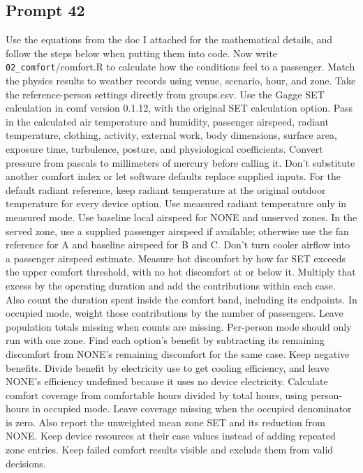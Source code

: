 \subsection*{Prompt 42}
Use the equations from the doc I attached for the mathematical details, and follow the steps below when putting them into code. Now write \nolinkurl{02_comfort}/comfort.R to calculate how the conditions feel to a passenger. Match the physics results to weather records using venue, scenario, hour, and zone. Take the reference-person settings directly from groups.csv.
Use the Gagge SET calculation in comf version 0.1.12, with the original SET calculation option. Pass in the calculated air temperature and humidity, passenger airspeed, radiant temperature, clothing, activity, external work, body dimensions, surface area, exposure time, turbulence, posture, and physiological coefficients. Convert pressure from pascals to millimeters of mercury before calling it. Don’t substitute another comfort index or let software defaults replace supplied inputs.
For the default radiant reference, keep radiant temperature at the original outdoor temperature for every device option. Use measured radiant temperature only in measured mode. Use baseline local airspeed for NONE and unserved zones. In the served zone, use a supplied passenger airspeed if available; otherwise use the fan reference for A and baseline airspeed for B and C. Don’t turn cooler airflow into a passenger airspeed estimate.
Measure hot discomfort by how far SET exceeds the upper comfort threshold, with no hot discomfort at or below it. Multiply that excess by the operating duration and add the contributions within each case. Also count the duration spent inside the comfort band, including its endpoints. In occupied mode, weight those contributions by the number of passengers. Leave population totals missing when counts are missing. Per-person mode should only run with one zone.
Find each option’s benefit by subtracting its remaining discomfort from NONE’s remaining discomfort for the same case. Keep negative benefits. Divide benefit by electricity use to get cooling efficiency, and leave NONE’s efficiency undefined because it uses no device electricity. Calculate comfort coverage from comfortable hours divided by total hours, using person-hours in occupied mode. Leave coverage missing when the occupied denominator is zero.
Also report the unweighted mean zone SET and its reduction from NONE. Keep device resources at their case values instead of adding repeated zone entries. Keep failed comfort results visible and exclude them from valid decisions.

